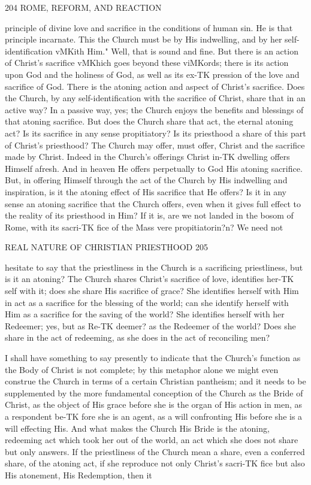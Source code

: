 \documentclass[12pt,a5paper,oneside]{book}
\begin{document}
{{204 ROME, REFORM, AND REACTION 

principle of divine love and sacrifice in the conditions 
of human sin. He is that principle incarnate. This 
the Church must be by His indwelling, and by her 
self-identification vMKith Him." Well, that is sound 
and fine. But there is an action of Christ's sacrifice 
vMKhich goes beyond these viMKords; there is its action 
upon God and the holiness of God, as well as its ex-TK
pression of the love and sacrifice of God. There is 
the atoning action and aspect of Christ's sacrifice. 
Does the Church, by any self-identification with the 
sacrifice of Christ, share that in an active way? In 
a passive way, yes; the Church enjoys the benefits and 
blessings of that atoning sacrifice. But does the 
Church share that act, the eternal atoning act? Is its 
sacrifice in any sense propitiatory? Is its priesthood a 
share of this part of Christ's priesthood? The Church 
may offer, must offer, Christ and the sacrifice made by 
Christ. Indeed in the Church's offerings Christ in-TK
dwelling offers Himself afresh. And in heaven He 
offers perpetually to God His atoning sacrifice. But, in 
offering Himself through the act of the Church by His 
indwelling and inspiration, is it the atoning effect of His 
sacrifice that He offers? Is it in any sense an atoning 
sacrifice that the Church offers, even when it gives full 
effect to the reality of its priesthood in Him? If it is, 
are we not landed in the bosom of Rome, with its sacri-TK
fice of the Mass vere propitiatorin?n? We need not 



REAL NATURE OF CHRISTIAN PRIESTHOOD 205 

hesitate to say that the priestliness in the Church is a 
sacrificing priestliness, but is it an atoning? The 
Church shares Christ's sacrifice of love, identifies her-TK
self with it; does she share His sacrifice of grace? 
She identifies herself with Him in act as a sacrifice for 
the blessing of the world; can she identify herself with 
Him as a sacrifice for the saving of the world? She 
identifies herself with her Redeemer; yes, but as Re-TK
deemer? as the Redeemer of the world? Does she 
share in the act of redeeming, as she does in the act 
of reconciling men? 

I shall have something to say presently to indicate 
that the Church's function as the Body of Christ is 
not complete; by this metaphor alone we might even 
construe the Church in terms of a certain Christian 
pantheism; and it needs to be supplemented by the 
more fundamental conception of the Church as the 
Bride of Christ, as the object of His grace before she 
is the organ of His action in men, as a respondent be-TK
fore she is an agent, as a will confronting His before 
she is a will effecting His. And what makes the 
Church His Bride is the atoning, redeeming act 
which took her out of the world, an act which she does 
not share but only answers. If the priestliness of the 
Church mean a share, even a conferred share, of the 
atoning act, if she reproduce not only Christ's sacri-TK
fice but also His atonement, His Redemption, then it 



}}
\end{document}
